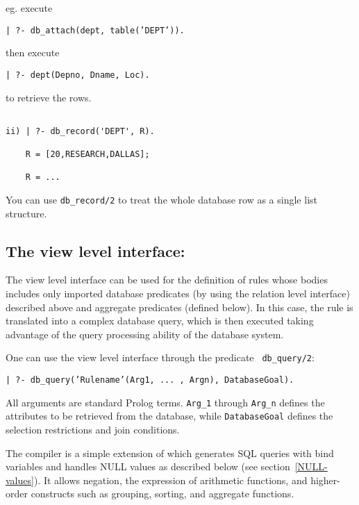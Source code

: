eg. execute 
\begin{center}
{\tt | ?- db\_attach(dept, table('DEPT')).} 
\end{center}
then execute 
\begin{center}	
{\tt | ?- dept(Depno, Dname, Loc).}
\end{center}
to retrieve the rows.
\begin{verbatim}

ii) | ?- db_record('DEPT', R).

    R = [20,RESEARCH,DALLAS];

    R = ...

\end{verbatim}
    You can use {\tt db\_record/2} to treat the whole database row as a single list structure.



\subsection{The view level interface:}



   The view level interface can be used for the definition of rules
whose bodies includes only imported database predicates (by using the
relation level interface) described above and aggregate predicates
(defined below).  In this case, the rule is translated into a complex
database query, which is then executed taking advantage of the query
processing ability of the database system.

One can use the view level interface through the predicate {\tt
db\_query/2}:  
\begin{center}
{\tt | ?- db\_query('Rulename'(Arg1, ... , Argn), DatabaseGoal).}
\end{center}
All arguments are standard Prolog terms.  {\tt Arg\_1} through {\tt Arg\_n}
defines the attributes to be retrieved from the database, while
{\tt DatabaseGoal} defines the selection restrictions and join conditions.

The compiler is a simple extension of \cite{Drax92} which generates SQL
queries with bind variables and handles NULL values as described below
(see section~\ref{NULL-values}).  It allows negation, the expression of
arithmetic functions, and higher-order constructs such as grouping,
sorting, and aggregate functions.

